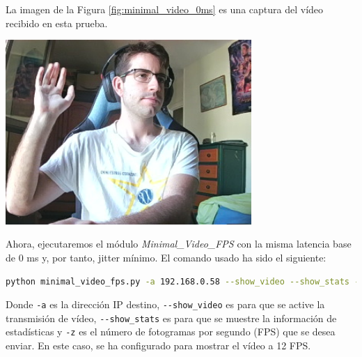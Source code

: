 \newpage
La imagen de la Figura \ref{fig:minimal_video_0ms} es una captura del vídeo recibido en esta prueba.
\begin{center}
  \includegraphics[width = 0.7\textwidth]{images/VideoRecibido4.1.png}
  \label{fig:minimal_video}
\end{center}

\newpage

Ahora, ejecutaremos el módulo \textit{Minimal\_Video\_FPS} con la misma latencia base de 0 ms y, por tanto, jitter mínimo. El comando usado ha sido el siguiente:

\begin{lstlisting}[language=bash, basicstyle=\ttfamily\scriptsize]
    python minimal_video_fps.py -a 192.168.0.58 --show_video --show_stats -z 12
\end{lstlisting}
Donde \verb|-a| es la dirección IP destino, \verb|--show_video| es para que se active la transmisión de vídeo, \verb|--show_stats| es para que se muestre la información de estadísticas y \verb|-z| es el número de fotogramas por segundo (FPS) que se desea enviar. En este caso, se ha configurado para mostrar el vídeo a 12 FPS.
\vspace{\baselineskip}


